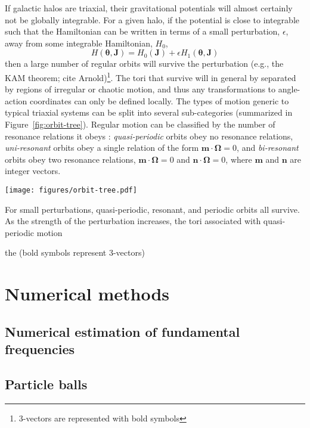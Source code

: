 \documentclass[letterpaper,12pt,preprint]{aastex}
\newcommand{\bs}[1]{\boldsymbol{#1}}
\begin{document}
If galactic halos are triaxial, their gravitational potentials will almost certainly not be globally integrable. For a given halo, if the potential is close to integrable such that the Hamiltonian can be written in terms of a small perturbation, $\epsilon$, away from some integrable Hamiltonian, $H_0$,
\begin{equation}
	H(\bs{\theta}, \bs{J}) = H_0(\bs{J}) + \epsilon H_1(\bs{\theta}, \bs{J})
\end{equation}
then a large number of regular orbits will survive the perturbation (e.g., the KAM theorem; cite Arnold)\footnote{3-vectors are represented with bold symbols}. The tori that survive will in general by separated by regions of irregular or chaotic motion, and thus any transformations to angle-action coordinates can only be defined locally. The types of motion generic to typical triaxial systems can be split into several sub-categories (summarized in Figure~\ref{fig:orbit-tree}). Regular motion can be classified by the number of resonance relations it obeys \citep[e.g.,][]{valluri98}: \emph{quasi-periodic} orbits obey no resonance relations, \emph{uni-resonant} orbits obey a single relation of the form $\bs{m}\cdot\bs{\Omega}=0$, and \emph{bi-resonant} orbits obey two resonance relations, $\bs{m}\cdot\bs{\Omega}=0$ and $\bs{n}\cdot\bs{\Omega}=0$, where $\bs{m}$ and $\bs{n}$ are integer vectors.

\begin{figure*}[!h]
\begin{center}
\texttt{[image: figures/orbit-tree.pdf]}
\caption{} \label{fig:orbit-tree}
\end{center}
\end{figure*}

For small perturbations, quasi-periodic, resonant, and periodic orbits all survive. As the strength of the perturbation increases, the tori associated with quasi-periodic motion 

the (bold symbols represent 3-vectors)


\section{Numerical methods}

\subsection{Numerical estimation of fundamental frequencies}

\subsection{Particle balls}
\end{document}
